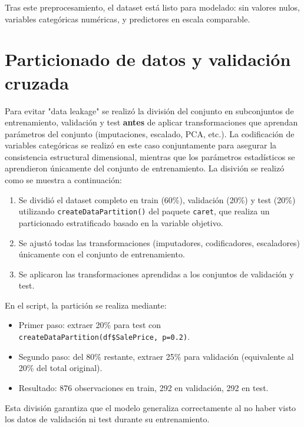 \documentclass[a4paper,twocolumn]{article}
\begin{document}
	Tras este preprocesamiento, el dataset está listo para modelado: sin valores nulos, variables categóricas numéricas, y predictores en escala comparable.


	\section{Particionado de datos y validación cruzada}
	\label{sec:particionado}

	Para evitar "data leakage"  se realizó la división del conjunto en subconjuntos de entrenamiento, validación y test \textbf{antes} de aplicar transformaciones que aprendan parámetros del conjunto (imputaciones, escalado, PCA, etc.). La codificación de variables categóricas se realizó en este caso conjuntamente para asegurar la consistencia estructural dimensional, mientras que los parámetros estadísticos se aprendieron únicamente del conjunto de entrenamiento. La disivión se realizó como se muestra a continuación:

	\begin{enumerate}
	  \item Se dividió el dataset completo en train (60\%), validación (20\%) y test (20\%) utilizando \texttt{createDataPartition()} del paquete \texttt{caret}, que realiza un particionado estratificado basado en la variable objetivo.
	  \item Se ajustó todas las transformaciones (imputadores, codificadores, escaladores) únicamente con el conjunto de entrenamiento.
	  \item Se aplicaron las transformaciones aprendidas a los conjuntos de validación y test.
	\end{enumerate}

	\vspace{0.2cm}

	En el script, la partición se realiza mediante:
	\begin{itemize}
	  \item Primer paso: extraer 20\% para test con \texttt{createDataPartition(df\$SalePrice, p=0.2)}.
	  \item Segundo paso: del 80\% restante, extraer 25\% para validación (equivalente al 20\% del total original).
	  \item Resultado: 876 observaciones en train, 292 en validación, 292 en test.
	\end{itemize}

	Esta división garantiza que el modelo generaliza correctamente al no haber visto los datos de validación ni test durante su entrenamiento.
\end{document}
